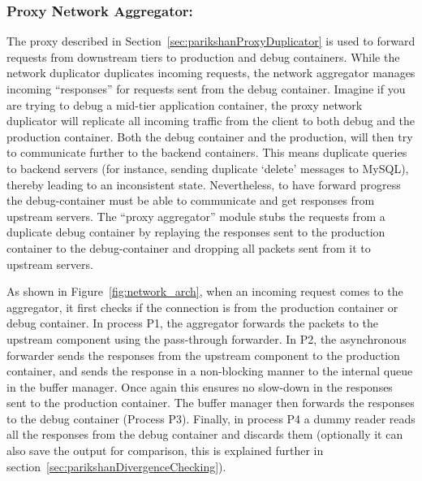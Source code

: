 \subsubsection{Proxy Network Aggregator:}
\label{sec:parikshanProxyAggregator}
The proxy described in Section~\ref{sec:parikshanProxyDuplicator} is used to forward requests from downstream tiers to production and debug containers.
While the network duplicator duplicates incoming requests, the network aggregator manages incoming ``responses'' for requests sent from the debug container. 
Imagine if you are trying to debug a mid-tier application container, the proxy network duplicator will replicate all incoming traffic from the client to both debug and the production container. 
Both the debug container and the production, will then try to communicate further to the backend containers.
This means duplicate queries to backend servers (for instance, sending duplicate `delete' messages to MySQL), thereby leading to an inconsistent state.
Nevertheless, to have forward progress the debug-container must be able to communicate and get responses from upstream servers.
The ``proxy aggregator'' module stubs the requests from a duplicate debug container by replaying the responses sent to the production container to the debug-container and dropping all packets sent from it to upstream servers.

As shown in  Figure~\ref{fig:network_arch}, when an incoming request comes to the aggregator, it first checks if the connection is from the production container or debug container. 
In process P1, the aggregator forwards the packets to the upstream component using the pass-through forwarder.
In P2, the asynchronous forwarder sends the responses from the upstream component to the production container, and sends the response in a non-blocking manner to the internal queue in the buffer manager. 
Once again this ensures no slow-down in the responses sent to the production container.
The buffer manager then forwards the responses to the debug container (Process P3).
Finally, in process P4 a dummy reader reads all the responses from the debug container and discards them (optionally it can also save the output for comparison, this is explained further in section~\ref{sec:parikshanDivergenceChecking}).


